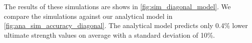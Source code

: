 The results of these simulations are shows in \cref{fig:sim_diagonal_model}.
We compare the simulations against our analytical model in \cref{fig:ana_sim_accuracy_diagonal}.
The analytical model predicts only 0.4\% lower ultimate strength values on average with a standard deviation of 10\%.









